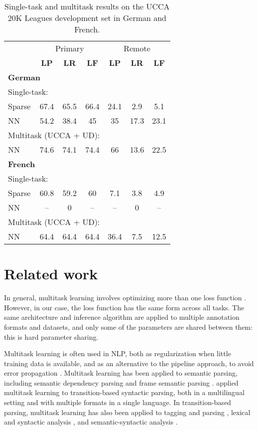 \documentclass[11pt,a4paper]{article}
\begin{document}
\begin{table}
\begin{tabular}{l|ccc|ccc}
& \multicolumn{3}{c|}{Primary} & \multicolumn{3}{c}{Remote} \\
& \textbf{LP} & \textbf{LR} & \textbf{LF} & \textbf{LP} & \textbf{LR} & \textbf{LF} \\
\multicolumn{4}{l|}{\textbf{German}} & \\
\multicolumn{4}{l|}{Single-task:} & \\
\small Sparse & 67.4 & 65.5 & 66.4 & 24.1 & 2.9 & 5.1 \\
\small NN & 54.2 & 38.4 & 45 & 35 & 17.3 & 23.1 \\
\multicolumn{4}{l|}{Multitask (UCCA + UD):} \\
\small NN & 74.6 & 74.1 & 74.4 & 66 & 13.6 & 22.5 \\
\hline
\multicolumn{4}{l|}{\textbf{French}} & \\
\multicolumn{4}{l|}{Single-task:} & \\
\small Sparse & 60.8 & 59.2 & 60 & 7.1 & 3.8 & 4.9 \\
\small NN & -- & 0 & -- & -- & 0 & -- \\
\multicolumn{4}{l|}{Multitask (UCCA + UD):} & \\
\small NN & 64.4 & 64.4 & 64.4 & 36.4 & 7.5 & 12.5
\end{tabular}
\caption{Single-task and multitask results on the UCCA 20K Leagues development set in German and French.\label{tab:multilingual}}
\end{table}



\section{Related work}\label{sec:related_work}

In general, multitask learning involves optimizing more than one loss function \cite{ruder2017overview}.
However, in our case, the loss function has the same form across all tasks.
The same architecture and inference algorithm are applied to multiple annotation formats and datasets,
and only some of the parameters are shared between them: this is hard parameter sharing.

Multitask learning is often used in NLP, both as regularization when little training data is available,
and as an alternative to the pipeline approach, to avoid error propagation
\cite{collobert2008unified}.
Multitask learning has been applied to semantic parsing, including
semantic dependency parsing \cite{P17-1186} and
frame semantic parsing \cite{swayamdipta2017frame}.
\citet{guo2016exploiting} applied multitask learning to transition-based
syntactic parsing,
both in a multilingual setting and with multiple formats in a single language.
In transition-based parsing, multitask learning has also been applied to
tagging and parsing \cite{bohnet2012transition,Zhang2016StackpropagationIR},
lexical and syntactic analysis \cite{constant-nivre:2016:P16-1,more2016joint},
and semantic-syntactic analysis \cite{swayamdipta-EtAl:2016:CoNLL,henderson2013multilingual}.
\end{document}
